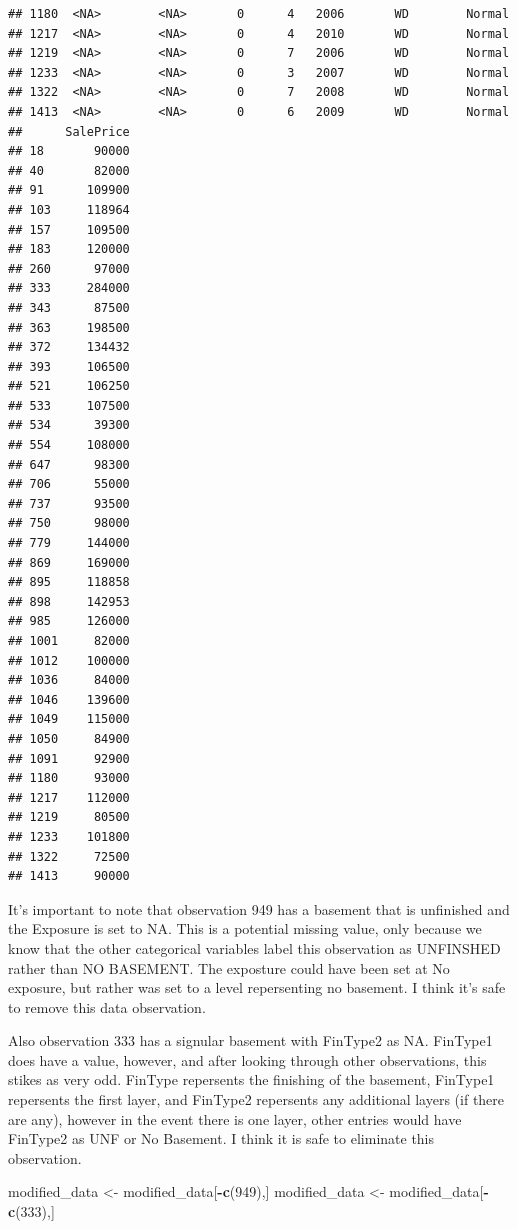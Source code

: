 \documentclass[]{article}
\newenvironment{Shaded}{\begin{snugshade}}{\end{snugshade}}
\newcommand{\KeywordTok}[1]{\textcolor[rgb]{0.13,0.29,0.53}{\textbf{#1}}}
\newcommand{\DecValTok}[1]{\textcolor[rgb]{0.00,0.00,0.81}{#1}}
\newcommand{\StringTok}[1]{\textcolor[rgb]{0.31,0.60,0.02}{#1}}
\newcommand{\OperatorTok}[1]{\textcolor[rgb]{0.81,0.36,0.00}{\textbf{#1}}}
\newcommand{\NormalTok}[1]{#1}
\begin{document}
\begin{verbatim}
## 1180  <NA>        <NA>       0      4   2006       WD        Normal
## 1217  <NA>        <NA>       0      4   2010       WD        Normal
## 1219  <NA>        <NA>       0      7   2006       WD        Normal
## 1233  <NA>        <NA>       0      3   2007       WD        Normal
## 1322  <NA>        <NA>       0      7   2008       WD        Normal
## 1413  <NA>        <NA>       0      6   2009       WD        Normal
##      SalePrice
## 18       90000
## 40       82000
## 91      109900
## 103     118964
## 157     109500
## 183     120000
## 260      97000
## 333     284000
## 343      87500
## 363     198500
## 372     134432
## 393     106500
## 521     106250
## 533     107500
## 534      39300
## 554     108000
## 647      98300
## 706      55000
## 737      93500
## 750      98000
## 779     144000
## 869     169000
## 895     118858
## 898     142953
## 985     126000
## 1001     82000
## 1012    100000
## 1036     84000
## 1046    139600
## 1049    115000
## 1050     84900
## 1091     92900
## 1180     93000
## 1217    112000
## 1219     80500
## 1233    101800
## 1322     72500
## 1413     90000
\end{verbatim}

It's important to note that observation 949 has a basement that is
unfinished and the Exposure is set to NA. This is a potential missing
value, only because we know that the other categorical variables label
this observation as UNFINSHED rather than NO BASEMENT. The exposture
could have been set at No exposure, but rather was set to a level
repersenting no basement. I think it's safe to remove this data
observation.

Also observation 333 has a signular basement with FinType2 as NA.
FinType1 does have a value, however, and after looking through other
observations, this stikes as very odd. FinType repersents the finishing
of the basement, FinType1 repersents the first layer, and FinType2
repersents any additional layers (if there are any), however in the
event there is one layer, other entries would have FinType2 as UNF or No
Basement. I think it is safe to eliminate this observation.

\begin{Shaded}
\begin{Highlighting}[]
\NormalTok{modified_data <-}\StringTok{ }\NormalTok{modified_data[}\OperatorTok{-}\KeywordTok{c}\NormalTok{(}\DecValTok{949}\NormalTok{),]}
\NormalTok{modified_data <-}\StringTok{ }\NormalTok{modified_data[}\OperatorTok{-}\KeywordTok{c}\NormalTok{(}\DecValTok{333}\NormalTok{),]}
\end{Highlighting}
\end{Shaded}
\end{document}
